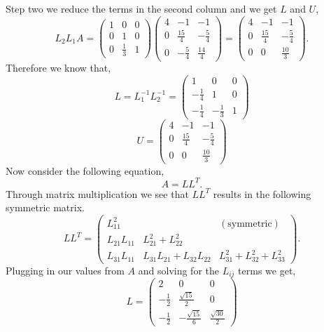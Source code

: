 \documentclass[12pt]{article}
\makeatletter
\theoremstyle{homework}
\newenvironment{exercise}[1]
{\def\@currentlabel{#1}\exercisecore}
{\endexercisecore}
\makeatother
\begin{document}
\begin{exercise}{Problem 7.1}
	Step two we reduce the terms in the second column and we get $L$ and $U$,
	\begin{equation*}
		L_2L_1A =  \begin{pmatrix}1&0&0\\ 0&1&0\\ 0&\frac{1}{3}&1\end{pmatrix}  \begin{pmatrix}4&-1&-1\\ 0&\frac{15}{4}&-\frac{5}{4}\\ 0&-\frac{5}{4}&\frac{14}{4}\end{pmatrix} = \begin{pmatrix}4&-1&-1\\ 0&\frac{15}{4}&-\frac{5}{4}\\ 0&0&\frac{10}{3}\end{pmatrix}.
	\end{equation*}
		Therefore we know that,
		\begin{equation*}
			L = L_1^{-1}L_2^{-1} = \begin{pmatrix}1&0&0\\ -\frac{1}{4}&1&0\\ -\frac{1}{4}&-\frac{1}{3}&1\end{pmatrix}
		\end{equation*}
		\begin{equation*}
			U = \begin{pmatrix}4&-1&-1\\ 0&\frac{15}{4}&-\frac{5}{4}\\ 0&0&\frac{10}{3}\end{pmatrix}
		\end{equation*}
		Now consider the following equation,
		\begin{equation*}
			A = LL^{T}.
		\end{equation*}
		Through matrix multiplication we see that $LL^{T}$ results in the following symmetric matrix.
		\begin{equation*}
		LL^{T} ={\begin{pmatrix}L_{11}^{2}&   &   ({\text{symmetric}})\\L_{21}L_{11}&   L_{21}^{2}+L_{22}^{2}&   \\L_{31}L_{11}&   L_{31}L_{21}+L_{32}L_{22}&   L_{31}^{2}+L_{32}^{2}+L_{33}^{2}\end{pmatrix}}.
		\end{equation*}
		Plugging in our values from $A$ and solving for the $L_{ij}$ terms we get,
		\begin{equation*}
			L =  \begin{pmatrix}2&0&0\\ -\frac{1}{2}&\frac{\sqrt{15}}{2}&0\\ -\frac{1}{2}&-\frac{\sqrt{15}}{6}&\frac{\sqrt{30}}{2} \end{pmatrix}

\end{equation*}
\end{exercise}
\end{document}
